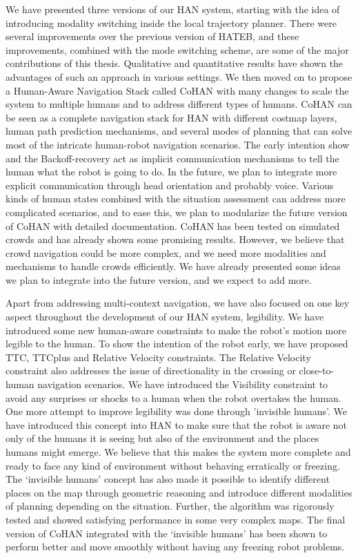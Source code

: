 We have presented three versions of our HAN system, starting with the idea of introducing modality switching inside the local trajectory planner. There were several improvements over the previous version of HATEB, and these improvements, combined with the mode switching scheme, are some of the major contributions of this thesis. Qualitative and quantitative results have shown the advantages of such an approach in various settings. We then moved on to propose a Human-Aware Navigation Stack called CoHAN with many changes to scale the system to multiple humans and to address different types of humans. CoHAN can be seen as a complete navigation stack for HAN with different costmap layers, human path prediction mechanisms, and several modes of planning that can solve most of the intricate human-robot navigation scenarios. The early intention show and the Backoff-recovery act as implicit communication mechanisms to tell the human what the robot is going to do. In the future, we plan to integrate more explicit communication through head orientation and probably voice. Various kinds of human states combined with the situation assessment can address more complicated scenarios, and to ease this, we plan to modularize the future version of CoHAN with detailed documentation. CoHAN has been tested on simulated crowds and has already shown some promising results. However, we believe that crowd navigation could be more complex, and we need more modalities and mechanisms to handle crowds efficiently. We have already presented some ideas we plan to integrate into the future version, and we expect to add more.

Apart from addressing multi-context navigation, we have also focused on one key aspect throughout the development of our HAN system, legibility. We have introduced some new human-aware constraints to make the robot's motion more legible to the human. To show the intention of the robot early, we have proposed TTC, TTCplus and Relative Velocity constraints. The Relative Velocity constraint also addresses the issue of directionality in the crossing or close-to-human navigation scenarios. We have introduced the Visibility constraint to avoid any surprises or shocks to a human when the robot overtakes the human. One more attempt to improve legibility was done through 'invisible humans’. We have introduced this concept into HAN to make sure that the robot is aware not only of the humans it is seeing but also of the environment and the places humans might emerge. We believe that this makes the system more complete and ready to face any kind of environment without behaving erratically or freezing. The `invisible humans’ concept has also made it possible to identify different places on the map through geometric reasoning and introduce different modalities of planning depending on the situation. Further, the algorithm was rigorously tested and showed satisfying performance in some very complex maps. The final version of CoHAN integrated with the `invisible humans’ has been shown to perform better and move smoothly without having any freezing robot problems. 

